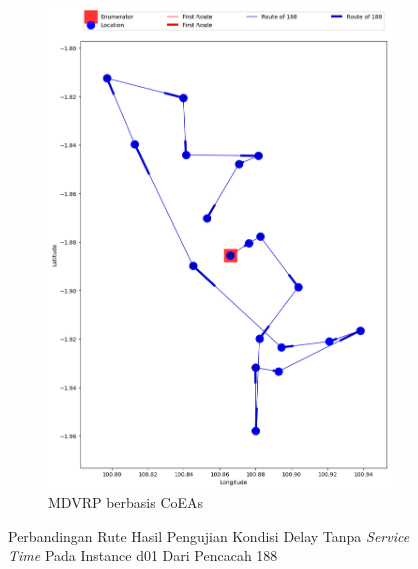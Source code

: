 \begin{figure}[H]
	\centering
	\begin{subfigure}[t]{\textwidth}
		\centering
		\includegraphics[width=\textwidth]{Resources/Images/delayed_1/real_m15_n100_delayed_1_188_coes}
		\caption{MDVRP berbasis CoEAs}
		\label{fig:real_m15_n100_delayed_1_188_coes}
	\end{subfigure}
	\caption{Perbandingan Rute Hasil Pengujian Kondisi Delay Tanpa \textit{Service Time} Pada Instance d01 Dari Pencacah 188}
	\label{fig:real_m15_n100_delayed_1_188}
\end{figure}


